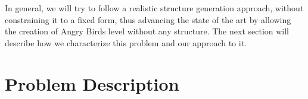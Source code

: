 \documentclass[runningheads,a4paper]{llncs}
\begin{document}

In general, we will try to follow a realistic structure generation
approach, without constraining it to a fixed form, thus advancing the
state of the art by allowing the creation of Angry Birds level without
any structure. The next section will describe how we characterize this
problem and our approach to it.

\section{Problem Description}
\label{sec:angry}



\end{document}
